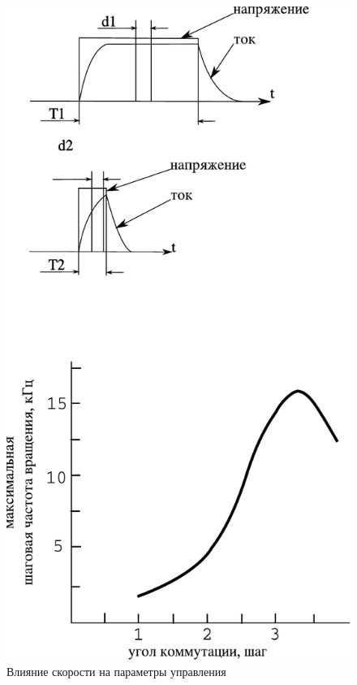 \begin{figure}
    \centering
    \includegraphics[height=0.75\textheight, keepaspectratio]{./src/pictures/max_step_motor_by_com_angle}
    \caption{Влияние скорости на параметры управления}
    \label{graph_speed_and_angle_comutation}
\end{figure}

